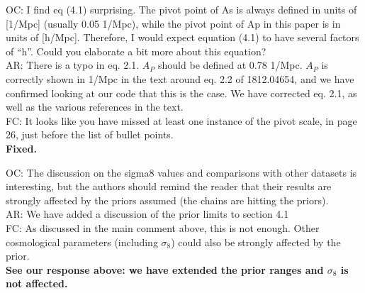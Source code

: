 \documentclass[12pt]{article}
\begin{document}
\hrulefill \newline

OC: I find eq (4.1) surprising. The pivot point of As is always defined in units of [1/Mpc] (usually 0.05 1/Mpc), while the pivot point of Ap in this paper is in units of [h/Mpc]. Therefore, I would expect equation (4.1) to have several factors of “h”. Could you elaborate a bit more about this equation?\\

AR: There is a typo in eq. 2.1. $A_P$ should be defined at 0.78 1/Mpc. $A_P$ is correctly shown in 1/Mpc in the text around eq. 2.2 of 1812.04654, and we have confirmed looking at our code that this is the case. We have corrected eq. 2.1, as well as the various references in the text.\\

FC: It looks like you have missed at least one instance of the pivot scale, in page 26, just before the list of bullet points.\\

\textbf{Fixed.}\\

\hrulefill \newline

OC: The discussion on the sigma8 values and comparisons with other datasets is interesting, but the authors should remind the reader that their results are strongly affected by the priors assumed (the chains are hitting the priors).\\

AR: We have added a discussion of the prior limits to section 4.1\\

FC: As discussed in the main comment above, this is not enough. Other cosmological parameters (including $\sigma_8$) could also be strongly affected by the prior.\\

\textbf{See our response above: we have extended the prior ranges and $\sigma_8$ is not affected.}\\

\hrulefill \newline
\end{document}
